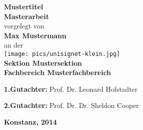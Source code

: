 \begin{titlepage}
\begin{center}
{\LARGE \textbf{Mustertitel}}
\\[1cm]
{\Large \textbf{Masterarbeit}}
\\[1cm]
{\Large vorgelegt von}
\\[0.5cm]
{\LARGE \textbf{Max Mustermann}}
\\[0.5cm]
{\Large an der}
\\[0.5cm]
\texttt{[image: pics/unisignet-klein.jpg]}
\\[1cm]
{\Large \textbf{Sektion Mustersektion}}
\\[1cm]
{\Large \textbf{Fachbereich Musterfachbereich}}
\\[2cm]
\begin{minipage}[c]{0.8\textwidth}
\begin{description}[style=multiline]
 \item {\Large \textbf{1.Gutachter:} Prof. Dr. Leonard Hofstadter}
 \item {\Large \textbf{2.Gutachter:} Prof. Dr. Dr. Sheldon Cooper}
\end{description}
\end{minipage}
\vfill
{\LARGE \textbf{Konstanz, 2014}}
\end{center}
\end{titlepage}
